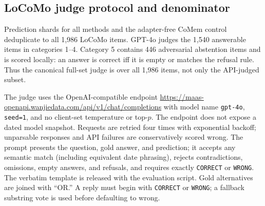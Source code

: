 \subsection{LoCoMo judge protocol and denominator}
Prediction shards for all methods and the adapter-free CoMem control deduplicate
to all 1,986 LoCoMo items.
GPT-4o judges the 1,540 answerable items in categories 1--4. Category 5 contains
446 adversarial abstention items and is scored locally: an answer is correct iff
it is empty or matches the refusal rule. Thus the canonical full-set judge is
over all 1,986 items, not only the API-judged subset.

\begin{center}
\small
\captionsetup{hypcap=false}
\setlength{\tabcolsep}{3pt}
\label{tab:locomo-categories}
\end{center}

The judge uses the OpenAI-compatible endpoint
\url{https://maas-openapi.wanjiedata.com/api/v1/chat/completions} with model name
\texttt{gpt-4o}, \texttt{seed=1}, and no client-set temperature or top-$p$.
The endpoint does not expose a dated model snapshot. Requests are retried four
times with exponential backoff; unparsable responses and API failures are
conservatively scored wrong. The prompt presents the question, gold answer, and prediction; it accepts any
semantic match (including equivalent date phrasing), rejects contradictions,
omissions, empty answers, and refusals, and requires exactly
\texttt{CORRECT} or \texttt{WRONG}. The verbatim template is released with the
evaluation script.
Gold alternatives are joined with ``OR.'' A reply must begin with
\texttt{CORRECT} or \texttt{WRONG}; a fallback substring vote is used before
defaulting to wrong.

